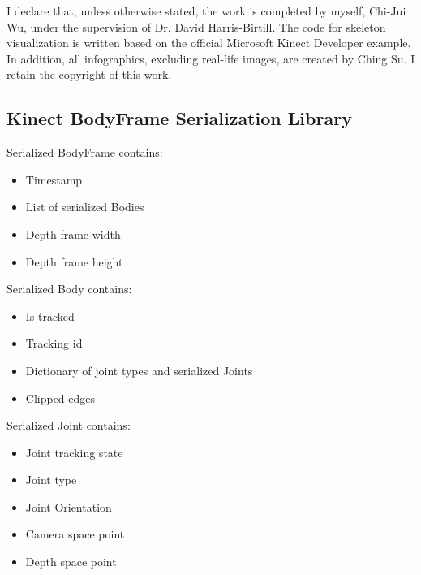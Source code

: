 \documentclass{sigchi}
\begin{document}
I declare that, unless otherwise stated, the work is completed by myself, Chi-Jui Wu, under the supervision of Dr. David Harris-Birtill. The code for skeleton visualization is written based on the official Microsoft Kinect Developer example.
In addition, all infographics, excluding real-life images, are created by Ching Su. I retain the copyright of this work.

\balance{}




\newpage
\begin{appendices}

\section{Kinect BodyFrame Serialization Library}
\label{sec:bodyframe_serialization}

Serialized BodyFrame contains:

\begin{itemize}
  \item Timestamp
  \item List of serialized Bodies
  \item Depth frame width
  \item Depth frame height
\end{itemize}

Serialized Body contains:

\begin{itemize}
  \item Is tracked
  \item Tracking id
  \item Dictionary of joint types and serialized Joints
  \item Clipped edges
\end{itemize}

Serialized Joint contains:

\begin{itemize}
  \item Joint tracking state
  \item Joint type
  \item Joint Orientation
  \item Camera space point
  \item Depth space point
\end{itemize}

\end{appendices}
\end{document}
